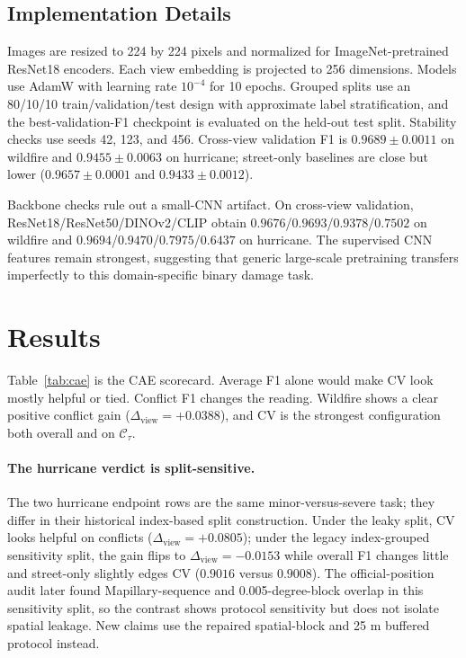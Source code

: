 \documentclass[sigconf]{acmart}
\newcommand{\conf}{\mathcal{C}_{\tau}}
\newcommand{\dview}{\Delta_{\mathrm{view}}}
\begin{document}
\subsection{Implementation Details}

Images are resized to 224 by 224 pixels and normalized for ImageNet-pretrained
ResNet18 encoders. Each view embedding is projected to 256 dimensions. Models
use AdamW with learning rate $10^{-4}$ for 10 epochs. Grouped splits use an
80/10/10 train/validation/test design with approximate label stratification, and
the best-validation-F1 checkpoint is evaluated on the held-out test split.
Stability checks use seeds 42, 123, and 456. Cross-view validation F1 is
$0.9689\pm0.0011$ on wildfire and $0.9455\pm0.0063$ on hurricane; street-only
baselines are close but lower ($0.9657\pm0.0001$ and $0.9433\pm0.0012$).

Backbone checks rule out a small-CNN artifact. On cross-view validation,
ResNet18/ResNet50/DINOv2/CLIP obtain
$0.9676$/\allowbreak$0.9693$/\allowbreak$0.9378$/\allowbreak$0.7502$ on wildfire
and $0.9694$/\allowbreak$0.9470$/\allowbreak$0.7975$/\allowbreak$0.6437$ on
hurricane. The supervised CNN features remain strongest, suggesting that generic
large-scale pretraining transfers imperfectly to this domain-specific binary
damage task.

\section{Results}

Table~\ref{tab:cae} is the CAE scorecard. Average F1 alone would make CV look
mostly helpful or tied. Conflict F1 changes the reading. Wildfire shows a clear
positive conflict gain ($\dview=+0.0388$), and CV is the strongest configuration
both overall and on $\conf$.

\paragraph{The hurricane verdict is split-sensitive.}
The two hurricane endpoint rows are the same minor-versus-severe task; they
differ in their historical index-based split construction. Under the leaky
split, CV looks helpful on conflicts ($\dview=+0.0805$); under the legacy
index-grouped sensitivity split, the gain flips to $\dview=-0.0153$ while
overall F1 changes little and street-only slightly edges CV ($0.9016$ versus
$0.9008$). The official-position audit later found Mapillary-sequence and
0.005-degree-block overlap in this sensitivity split, so the contrast shows
protocol sensitivity but does not isolate spatial leakage. New claims use the
repaired spatial-block and 25 m buffered protocol instead.
\end{document}
